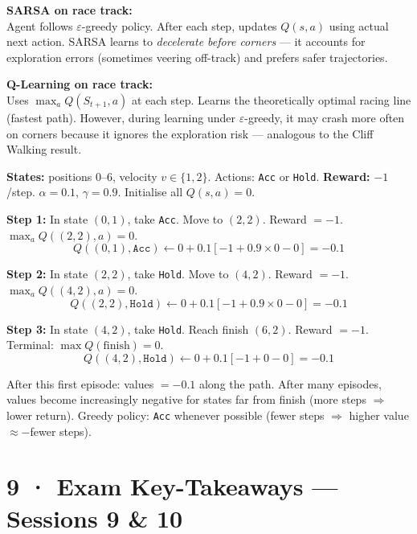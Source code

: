 \documentclass[11pt,a4paper]{article}
\begin{document}
\textbf{SARSA on race track:}\\
Agent follows $\varepsilon$-greedy policy. After each step, updates $Q(s,a)$ using actual next action.
SARSA learns to \emph{decelerate before corners} — it accounts for exploration errors (sometimes
veering off-track) and prefers safer trajectories.

\textbf{Q-Learning on race track:}\\
Uses $\max_a Q(S_{t+1}, a)$ at each step. Learns the theoretically optimal racing line (fastest path).
However, during learning under $\varepsilon$-greedy, it may crash more often on corners because it
ignores the exploration risk — analogous to the Cliff Walking result.

\begin{tcolorbox}[exam={Simplified 1-D Race Car Trace — Q-Learning}]
\textbf{States:} positions 0--6, velocity $v \in \{1,2\}$. Actions: \texttt{Acc} or \texttt{Hold}.
\textbf{Reward:} $-1$/step. $\alpha=0.1$, $\gamma=0.9$.
Initialise all $Q(s,a)=0$.

\medskip
\textbf{Step 1:} In state $(0,1)$, take \texttt{Acc}. Move to $(2,2)$. Reward $=-1$.\\
$\max_a Q((2,2), a) = 0$.
\[
  Q((0,1),\texttt{Acc}) \leftarrow 0 + 0.1[-1 + 0.9 \times 0 - 0] = -0.1
\]

\textbf{Step 2:} In state $(2,2)$, take \texttt{Hold}. Move to $(4,2)$. Reward $=-1$.\\
$\max_a Q((4,2), a) = 0$.
\[
  Q((2,2),\texttt{Hold}) \leftarrow 0 + 0.1[-1 + 0.9 \times 0 - 0] = -0.1
\]

\textbf{Step 3:} In state $(4,2)$, take \texttt{Hold}. Reach finish $(6,2)$. Reward $=-1$.
Terminal: $\max Q(\text{finish}) = 0$.
\[
  Q((4,2),\texttt{Hold}) \leftarrow 0 + 0.1[-1 + 0 - 0] = -0.1
\]

\medskip
After this first episode: values $= -0.1$ along the path. After many episodes, values become
increasingly negative for states far from finish (more steps $\Rightarrow$ lower return).
Greedy policy: \texttt{Acc} whenever possible (fewer steps $\Rightarrow$ higher value $\approx -$fewer steps).
\end{tcolorbox}

\section*{9 · Exam Key-Takeaways — Sessions 9 \& 10}
\end{document}
